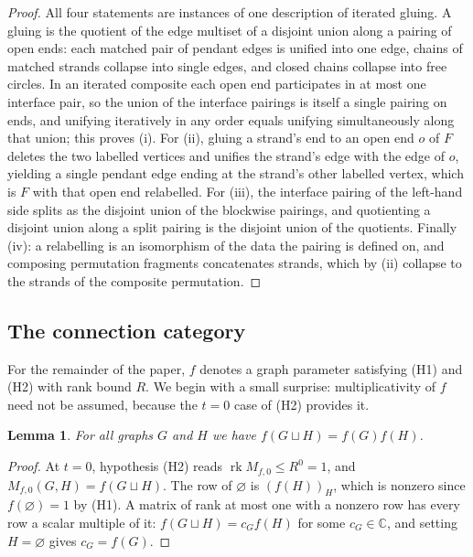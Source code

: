\documentclass[11pt]{article}
\newtheorem{lemm}[theo]{Lemma}
\newcommand{\emptygraph}{\varnothing}
\newcommand{\connmat}[2]{M_{#1,#2}}               %
\newcommand{\rk}{\operatorname{rk}}
\begin{document}
\begin{proof}
All four statements are instances of one description of iterated
gluing. A gluing is the quotient of the edge multiset of a disjoint
union along a pairing of open ends: each matched pair of pendant
edges is unified into one edge, chains of matched strands collapse
into single edges, and closed chains collapse into free circles. In
an iterated composite each open end participates in at most one
interface pair, so the union of the interface pairings is itself a
single pairing on ends, and unifying iteratively in any order equals
unifying simultaneously along that union; this proves (i). For (ii),
gluing a strand's end to an open end $o$ of $F$ deletes the two
labelled vertices and unifies the strand's edge with the edge of
$o$, yielding a single pendant edge ending at the strand's other
labelled vertex, which is $F$ with that open end relabelled. For
(iii), the interface pairing of the left-hand side splits as the
disjoint union of the blockwise pairings, and quotienting a disjoint
union along a split pairing is the disjoint union of the quotients.
Finally (iv): a relabelling is an isomorphism of the data the
pairing is defined on, and composing permutation fragments
concatenates strands, which by (ii) collapse to the strands of the
composite permutation.
\end{proof}

\subsection{The connection category}\label{subsec:categorydef}

For the remainder of the paper, $f$ denotes a graph parameter
satisfying (H1) and (H2) with rank bound $R$. We begin with a small
surprise: multiplicativity of $f$ need not be assumed, because the
$t=0$ case of (H2) provides it.

\begin{lemm}\label{lemm:mult}
For all graphs $G$ and $H$ we have $f(G\sqcup H)=f(G)f(H)$.
\end{lemm}

\begin{proof}
At $t=0$, hypothesis (H2) reads $\rk\connmat{f}{0}\le R^{0}=1$, and
$\connmat{f}{0}(G,H)=f(G\sqcup H)$. The row of $\emptygraph$ is
$(f(H))_{H}$, which is nonzero since $f(\emptygraph)=1$ by (H1).
A matrix of rank at most one with a nonzero row has every row a
scalar multiple of it: $f(G\sqcup H)=c_{G}f(H)$ for some
$c_{G}\in\mathbb{C}$, and setting $H=\emptygraph$ gives
$c_{G}=f(G)$.
\end{proof}
\end{document}
